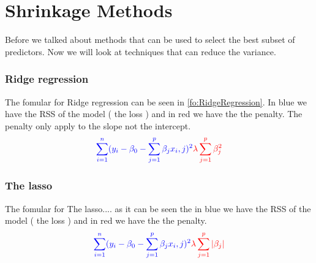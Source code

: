 \chapter{Shrinkage Methods} \label{ch:shrinkageMethods}
Before we talked about methods that can be used to select the best subset of predictors. Now we will look at techniques that can reduce the variance.




\subsection{Ridge regression}

The fomular for Ridge regression can be seen in \ref{fo:RidgeRegression}. In blue we have the RSS of the model ( the loss ) and in red we have the the penalty. The penalty only apply to the slope not the intercept.
\begin{align}\label{fo:RidgeRegression}
\color{blue} \sum_{i=1}^{n} ( y_i - \beta_0 - \sum_{j=1}^{p} \beta_j x_i,j )^2  \color{red} \lambda \sum_{j=1}^{p} \beta^2_j 
\end{align}


\subsection{The lasso}
The fomular for The lasso.... as it can be seen the in blue we have the RSS of the model ( the loss ) and in red we have the the penalty.
\begin{align}\label{fo:TheLasso}
\color{blue} \sum_{i=1}^{n} ( y_i - \beta_0 - \sum_{j=1}^{p} \beta_j x_i,j )^2  \color{red} \lambda \sum_{j=1}^{p} |\beta_j|
\end{align}
